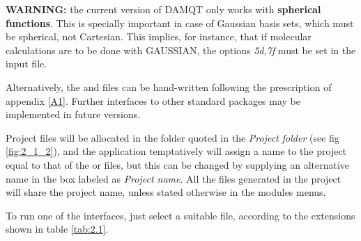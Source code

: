 \documentclass[10pt]{article}
\begin{document}
{\bf WARNING:} the current version of DAMQT only works with {\bf spherical
functions}. This is specially important in case of
Gaussian basis sets, which must be spherical, not
Cartesian. This implies, for instance,
that if molecular calculations are to be done with GAUSSIAN, the options {\it
5d,7f} must be set in the input file.


Alternatively, the \ggbs{ } and \den{ } files can be hand-written
following the prescription of appendix \ref{A1}. Further interfaces to
other standard packages may be implemented in future versions.

Project files will be allocated in the folder quoted in the {\it Project folder} (see fig \ref{fig:2_1_2}), 
and the application temptatively will assign a name to the project equal to that of the
\ggbs{ } or \sgbs{ } files, but this can be changed by supplying an
alternative name in the box labeled as {\it Project name}.
All the files generated in the project will share the project name, unless
stated otherwise in the modules menus.


To run one of the interfaces, just select a suitable file, according to 
the extensions shown in table \ref{tab:2.1}.
 
\end{document}
